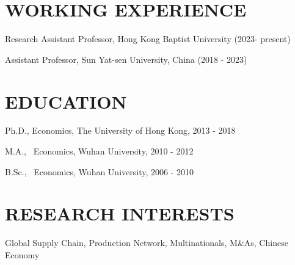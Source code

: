 \documentclass{res}
\begin{document}
 


 
\address{\\WLB 527A, Department of Accountancy, Economics and Finance  \\  School of Business, Hong Kong Baptist University, Hong Kong\\}
\address{\\ \textbf{Email: }cqzhan@hkbu.edu.hk\\   \textbf{Mobile: }(+852)54453089\\}

                                  
\begin{resume}

\section{WORKING EXPERIENCE}  
 \vspace{0.8em}
 
Research Assistant Professor, Hong Kong Baptist University (2023- present) \\  \vspace{-1.6em}

Assistant Professor, Sun Yat-sen University, China  (2018 - 2023) 

\section{EDUCATION} 
 \vspace{0.8em}
         
Ph.D., Economics, The University of Hong Kong, 2013 - 2018\\
 \vspace{-1.6em}
 
M.A., \ Economics, Wuhan University, 2010 - 2012\\
 \vspace{-1.6em}
 
B.Sc., \ Economics, Wuhan University, 2006 - 2010      

\section{RESEARCH INTERESTS}  
 \vspace{0.8em}
        
Global Supply Chain, Production Network,  Multinationals, M\&As, Chinese Economy 
 

\end{resume}
\end{document}
